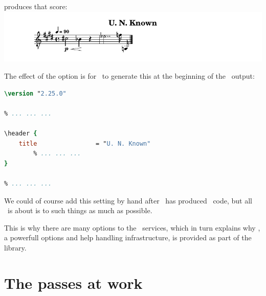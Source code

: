 produces that score:\\
\includegraphics[scale=0.7]{../mfgraphics/mfgraphicsMinimalScoreWithAnotherTitle.png}

The effect of the  option is for \xmlToLy\ to generate this at the beginning of the \lily\ output:
\begin{lstlisting}[language=Lilypond]
\version "2.25.0"

% ... ... ...

\header {
    title                = "U. N. Known"
		% ... ... ...
}

% ... ... ...
\end{lstlisting}

We could of course add this  setting by hand after \xmlToLy\ has produced \lily\ code, but all \mf\ is about is to  such things as much as possible.

This is why there are  many options to the \mf\ services, which in turn explains why \oahRepr, a powerfull options and help handling infrastructure, is provided as part of the library.


\section{The passes at work}

